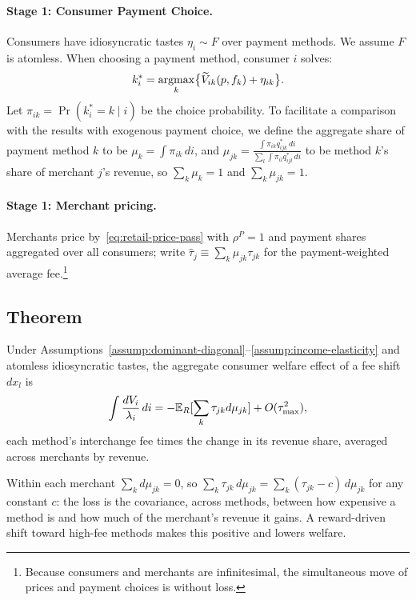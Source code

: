 \documentclass[main.tex]{subfiles}
\begin{document}
\paragraph{Stage 1: Consumer Payment Choice.}
Consumers have idiosyncratic tastes $\eta_i \sim F$ over payment methods.
We assume $F$ is atomless.
When choosing a payment method, consumer $i$ solves:
\[
k^*_i=\argmax_k\bigl\{\widetilde V_{ik}(p,f_k)+\eta_{ik}\bigr\}.
\]
Let $\pi_{ik}=\Pr(k^*_i=k\mid i)$ be the choice probability. 
To facilitate a comparison with the results with exogenous payment choice, we define the aggregate share of payment method $k$ to be $\mu_k=\int\pi_{ik}\,di$, and $\mu_{jk}=\frac{\int \pi_{ik}q^*_{ijk}\,di}{\sum_l \int \pi_{il}q^*_{ijl}\,di}$ to be method $k$'s share of merchant $j$'s revenue, so $\sum_k\mu_k=1$ and $\sum_k\mu_{jk}=1$.

\paragraph{Stage 1: Merchant pricing.}
Merchants price by~\eqref{eq:retail-price-pass} with $\rho^P=1$ and payment shares aggregated over all consumers; write $\hat\tau_j\equiv\sum_k\mu_{jk}\tau_{jk}$ for the payment-weighted average fee.\footnote{Because consumers and merchants are infinitesimal, the simultaneous move of prices and payment choices is without loss.}

\subsection{Theorem}\label{subsec:endo-theorem}

\begin{theorem}\label{thm:endo-welfare}
Under Assumptions~\ref{assump:dominant-diagonal}--\ref{assump:income-elasticity} and atomless idiosyncratic tastes, the aggregate consumer welfare effect of a fee shift $dx_l$ is
\begin{equation}
\int\frac{dV_i}{\lambda_i}\,di = -\mathbb{E}_R[\sum_k \tau_{jk} d\mu_{jk}] + O(\tau_{\max}^2),
\label{eq:endo-total-welfare}
\end{equation}
each method's interchange fee times the change in its revenue share, averaged across merchants by revenue.
\end{theorem}

Within each merchant $\sum_k d\mu_{jk}=0$, so $\sum_k\tau_{jk}\,d\mu_{jk}=\sum_k(\tau_{jk}-c)\,d\mu_{jk}$ for any constant $c$: the loss is the covariance, across methods, between how expensive a method is and how much of the merchant's revenue it gains.
A reward-driven shift toward high-fee methods makes this positive and lowers welfare.
\end{document}

